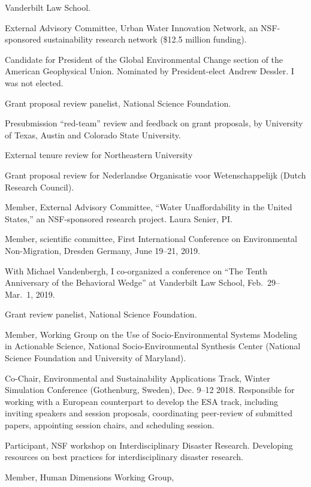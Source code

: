   Vanderbilt Law School.
\item[2016--2021] External Advisory Committee,
  Urban Water Innovation Network, an NSF-sponsored sustainability
  research network (\$12.5 million funding).
\item[2022] Candidate for President of the Global Environmental Change
  section of the American Geophysical Union. Nominated by President-elect
  Andrew Dessler. I was not elected.
\item[2022] Grant proposal review panelist, National Science Foundation.
\item[2022] Presubmission ``red-team'' review and feedback on grant proposals,
  by University of Texas, Austin and Colorado State University.
\item[2021] External tenure review for Northeastern University
\item[2021] Grant proposal review for Nederlandse Organisatie voor Wetenschappelijk
  (Dutch Research Council).
\item[2019--2021] Member, External Advisory Committee,
  ``Water Unaffordability in the United States,''
  an NSF-sponsored research project. Laura Senier, PI.
\item[2019] Member, scientific committee,
  First International Conference on Environmental Non-Migration,
  Dresden Germany, June 19--21, 2019.
\item[2019] With Michael Vandenbergh, I co-organized a conference on
  ``The Tenth Anniversary of the Behavioral Wedge'' at Vanderbilt Law School,
   Feb.~29--Mar.~1, 2019.
\item[2018] Grant review panelist, National Science Foundation.
\item[2018] Member, Working Group on the Use of Socio-Environmental Systems
  Modeling in Actionable Science,
  National Socio-Environmental Synthesis Center
  (National Science Foundation and University of Maryland).
\item[2018] Co-Chair, Environmental and Sustainability Applications Track,
   Winter Simulation Conference (Gothenburg, Sweden), Dec. 9--12 2018.
   Responsible for working with a European counterpart to develop the ESA
   track, including inviting speakers and session proposals, coordinating
   peer-review of submitted papers, appointing session chairs, and scheduling
   session.
\item[2017--2018] Participant, NSF workshop on
  Interdisciplinary Disaster Research.
  Developing resources on best practices for interdisciplinary disaster
  research.
\item[2017--2018] Member, Human Dimensions Working Group,
